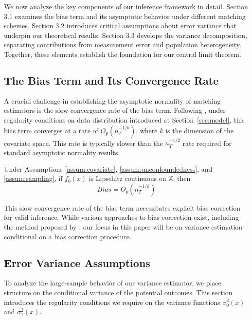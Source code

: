 \documentclass{mytemplate}
\begin{document}
We now analyze the key components of our inference framework in detail. Section 3.1 examines the bias term and its asymptotic behavior under different matching schemes. Section 3.2 introduces critical assumptions about error variance that underpin our theoretical results. Section 3.3 develops the variance decomposition, separating contributions from measurement error and population heterogeneity. Together, these elements establish the foundation for our central limit theorem.

\subsection{The Bias Term and Its Convergence Rate}
\label{sec:the-bias-term}
A crucial challenge in establishing the asymptotic normality of matching estimators is the slow convergence rate of the bias term. Following \cite{abadie2006large}, under regularity conditions on data distribution introduced at Section~\ref{sec:model}, this bias term converges at a rate of $O_p(n_T^{-1/k})$, where $k$ is the dimension of the covariate space. This rate is typically slower than the $n_T^{-1/2}$ rate required for standard asymptotic normality results.


\begin{proposition}
Under Assumptions \ref{assum:covariate}, \ref{assum:unconfoundedness}, and \ref{assum:sampling}, if $f_0(x)$ is Lipschitz continuous on $\mathbb{X}$, then
$$Bias = O_p(n_T^{-1/k})$$
\end{proposition}

This slow convergence rate of the bias term necessitates explicit bias correction for valid inference. While various approaches to bias correction exist, including the method proposed by \cite{abadie2011bias}, our focus in this paper will be on variance estimation conditional on a bias correction procedure.



\subsection{Error Variance Assumptions}
\label{sec:err-var-assumptions}

To analyze the large-sample behavior of our variance estimator, we place structure on the conditional variance of the potential outcomes. This section introduces the regularity conditions we require on the variance functions $\sigma_0^2(x)$ and $\sigma_1^2(x)$.
\end{document}
